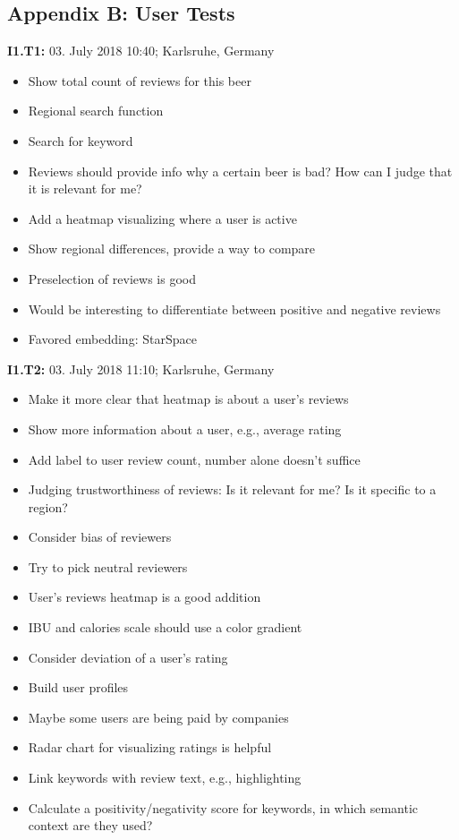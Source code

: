 \subsection*{Appendix B: User Tests} \label{sec:appendix-b}

\begin{flushleft}
    \textbf{I1.T1:} 03. July 2018 10:40; Karlsruhe, Germany
    \begin{itemize}
        \item Show total count of reviews for this beer
        \item Regional search function
        \item Search for keyword
        \item Reviews should provide info why a certain beer is bad? How can I judge that it is relevant for me?
        \item Add a heatmap visualizing where a user is active
        \item Show regional differences, provide a way to compare
        \item Preselection of reviews is good
        \item Would be interesting to differentiate between positive and negative reviews
        \item Favored embedding: StarSpace
    \end{itemize}
\end{flushleft}

\hfill

\begin{flushleft}
    \textbf{I1.T2:} 03. July 2018 11:10; Karlsruhe, Germany
    \begin{itemize}
        \item Make it more clear that heatmap is about a user's reviews
        \item Show more information about a user, e.g., average rating
        \item Add label to user review count, number alone doesn't suffice
        \item Judging trustworthiness of reviews: Is it relevant for me? Is it specific to a region?
        \item Consider bias of reviewers
        \item Try to pick neutral reviewers
        \item User's reviews heatmap is a good addition
        \item IBU and calories scale should use a color gradient
        \item Consider deviation of a user's rating
        \item Build user profiles
        \item Maybe some users are being paid by companies
        \item Radar chart for visualizing ratings is helpful
        \item Link keywords with review text, e.g., highlighting
        \item Calculate a positivity/negativity score for keywords, in which semantic context are they used?
    \end{itemize}
\end{flushleft}

